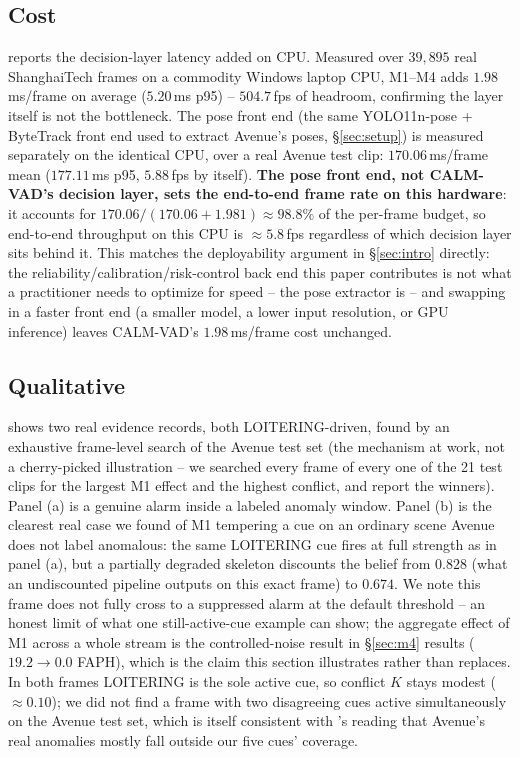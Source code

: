 \documentclass[conference]{IEEEtran}
\newcommand{\method}{CALM-VAD}
\begin{document}
\subsection{Cost}

 reports the decision-layer latency added on CPU. Measured over
$39{,}895$ real ShanghaiTech frames on a commodity Windows laptop CPU, M1--M4
adds $1.98$\,ms/frame on average ($5.20$\,ms p95) -- $504.7$\,fps of headroom,
confirming the layer itself is not the bottleneck. The pose front end (the
same YOLO11n-pose + ByteTrack front end used to extract Avenue's poses,
\S\ref{sec:setup}) is measured separately on the identical CPU, over a real
Avenue test clip: $170.06$\,ms/frame mean ($177.11$\,ms p95, $5.88$\,fps by
itself). \textbf{The pose front end, not \method{}'s decision layer, sets
the end-to-end frame rate on this hardware}: it accounts for
$170.06/(170.06+1.981)\approx98.8\%$ of the per-frame budget, so end-to-end
throughput on this CPU is $\approx5.8$\,fps regardless of which decision
layer sits behind it. This matches the deployability argument in
\S\ref{sec:intro} directly: the reliability/calibration/risk-control back end
this paper contributes is not what a practitioner needs to optimize for
speed -- the pose extractor is -- and swapping in a faster front end
(a smaller model, a lower input resolution, or GPU inference) leaves
\method{}'s $1.98$\,ms/frame cost unchanged.

\subsection{Qualitative}

 shows two real evidence records, both LOITERING-driven,
found by an exhaustive frame-level search of the Avenue test set (the
mechanism at work, not a cherry-picked illustration -- we searched every
frame of every one of the 21 test clips for the largest M1 effect and the
highest conflict, and report the winners). Panel (a) is a genuine alarm
inside a labeled anomaly window. Panel (b) is the clearest real case we
found of M1 tempering a cue on an ordinary scene Avenue does not label
anomalous: the same LOITERING cue fires at full strength as in panel (a),
but a partially degraded skeleton discounts the belief from $0.828$ (what
an undiscounted pipeline outputs on this exact frame) to $0.674$. We note
this frame does not fully cross to a suppressed alarm at the default
threshold -- an honest limit of what one still-active-cue example can show;
the aggregate effect of M1 across a whole stream is the controlled-noise
result in \S\ref{sec:m4} results ($19.2\to0.0$ FAPH), which is the claim
this section illustrates rather than replaces. In both frames LOITERING is
the sole active cue, so conflict $K$ stays modest ($\approx0.10$); we did
not find a frame with two disagreeing cues active simultaneously on the
Avenue test set, which is itself consistent with 's
reading that Avenue's real anomalies mostly fall outside our five cues'
coverage.
\end{document}
